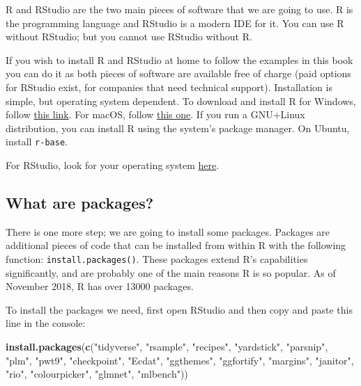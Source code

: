 \documentclass[]{gitbook}
\newenvironment{Shaded}{\begin{snugshade}}{\end{snugshade}}
\newcommand{\KeywordTok}[1]{\textcolor[rgb]{0.13,0.29,0.53}{\textbf{#1}}}
\newcommand{\NormalTok}[1]{#1}
\newcommand{\StringTok}[1]{\textcolor[rgb]{0.31,0.60,0.02}{#1}}
\begin{document}
R and RStudio are the two main pieces of software that we are going to use. R is the programming
language and RStudio is a modern IDE for it. You can use R without RStudio; but you cannot use
RStudio without R.

If you wish to install R and RStudio at home to follow the examples in this book you can do it as
both pieces of software are available free of charge (paid options for RStudio exist, for companies
that need technical support). Installation is simple, but operating system dependent. To download
and install R for Windows, follow \href{https://cloud.r-project.org/bin/windows/base/}{this link}.
For macOS, follow \href{https://cloud.r-project.org/bin/macosx/}{this one}. If you run a GNU+Linux
distribution, you can install R using the system's package manager. On Ubuntu, install \texttt{r-base}.

For RStudio, look for your operating system \href{https://www.rstudio.com/products/rstudio/download/\#download}{here}.

\hypertarget{what-are-packages}{%
\subsection*{What are packages?}\label{what-are-packages}}

There is one more step; we are going to install some packages. Packages are additional pieces of
code that can be installed from within R with the following function: \texttt{install.packages()}. These
packages extend R's capabilities significantly, and are probably one of the main reasons R is so
popular. As of November 2018, R has over 13000 packages.

To install the packages we need, first open RStudio and then copy and paste this line in the console:

\begin{Shaded}
\begin{Highlighting}[]
\KeywordTok{install.packages}\NormalTok{(}\KeywordTok{c}\NormalTok{(}\StringTok{"tidyverse"}\NormalTok{, }\StringTok{"rsample"}\NormalTok{, }\StringTok{"recipes"}\NormalTok{, }\StringTok{"yardstick"}\NormalTok{, }\StringTok{"parsnip"}\NormalTok{, }\StringTok{"plm"}\NormalTok{, }\StringTok{"pwt9"}\NormalTok{, }
                   \StringTok{"checkpoint"}\NormalTok{, }\StringTok{"Ecdat"}\NormalTok{, }\StringTok{"ggthemes"}\NormalTok{, }\StringTok{"ggfortify"}\NormalTok{, }\StringTok{"margins"}\NormalTok{, }\StringTok{"janitor"}\NormalTok{, }\StringTok{"rio"}\NormalTok{, }
                   \StringTok{"colourpicker"}\NormalTok{, }\StringTok{"glmnet"}\NormalTok{, }\StringTok{"mlbench"}\NormalTok{))}
\end{Highlighting}
\end{Shaded}
\end{document}
